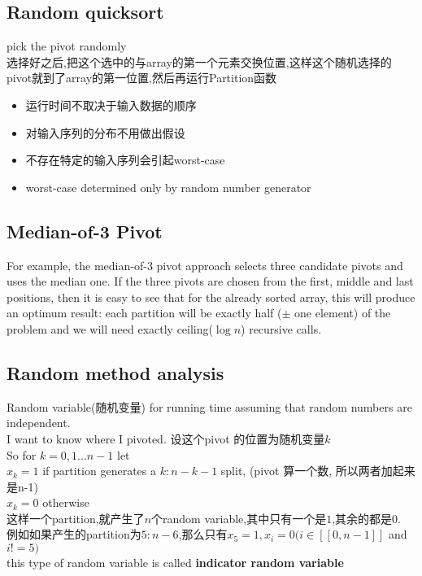 \documentclass{article}
\begin{document}
\subsection{Random quicksort}
pick the pivot randomly\\
选择好之后,把这个选中的与array的第一个元素交换位置,这样这个随机选择的pivot就到了array的第一位置,然后再运行Partition函数
\begin{itemize}
\item 运行时间不取决于输入数据的顺序
\item 对输入序列的分布不用做出假设
\item 不存在特定的输入序列会引起worst-case
\item worst-case determined only by random number generator
\end{itemize}

\subsection{Median-of-3 Pivot}
For example, the median-of-3 pivot approach selects three candidate pivots and uses the median one.
If the three pivots are chosen from the first, middle and last positions, then it is easy to see that for the already sorted array,
this will produce an optimum result: each partition will be exactly half ($\pm$ one element) of the problem and we will need exactly ceiling($\log n$) recursive calls.

\subsection{Random method analysis}
Random variable(随机变量) for running time assuming that random numbers are independent.\\
I want to know where I pivoted. 设这个pivot 的位置为随机变量$k$\\
So for $k=0, 1...n-1$ let\\
$x_k=1$ if partition generates a $k: n-k-1$ split, (pivot 算一个数, 所以两者加起来是n-1)\\
$x_k=0$ otherwise\\
这样一个partition,就产生了$n$个random variable,其中只有一个是$1$,其余的都是$0$.\\
例如如果产生的partition为$5:n-6$,那么只有$x_5=1,x_i=0 (i \in  [[0,n-1]]$ and $i!=5)$\\
this type of random variable is called \textbf{indicator random variable}
\end{document}
